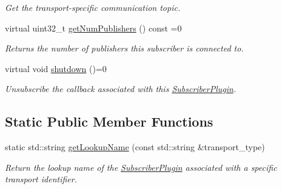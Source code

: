 \begin{DoxyCompactItemize}
\begin{DoxyCompactList}\small\item\em Get the transport-\/specific communication topic. \end{DoxyCompactList}\item 
\hypertarget{classimage__transport_1_1_subscriber_plugin_a7fae40b302a6493d00b0cd8905484677}{virtual uint32\-\_\-t \hyperlink{classimage__transport_1_1_subscriber_plugin_a7fae40b302a6493d00b0cd8905484677}{get\-Num\-Publishers} () const =0}\label{classimage__transport_1_1_subscriber_plugin_a7fae40b302a6493d00b0cd8905484677}

\begin{DoxyCompactList}\small\item\em Returns the number of publishers this subscriber is connected to. \end{DoxyCompactList}\item 
\hypertarget{classimage__transport_1_1_subscriber_plugin_aa8af1348748aef7372bf248a69f775a7}{virtual void \hyperlink{classimage__transport_1_1_subscriber_plugin_aa8af1348748aef7372bf248a69f775a7}{shutdown} ()=0}\label{classimage__transport_1_1_subscriber_plugin_aa8af1348748aef7372bf248a69f775a7}

\begin{DoxyCompactList}\small\item\em Unsubscribe the callback associated with this \hyperlink{classimage__transport_1_1_subscriber_plugin}{Subscriber\-Plugin}. \end{DoxyCompactList}\end{DoxyCompactItemize}
\subsection*{Static Public Member Functions}
\begin{DoxyCompactItemize}
\item 
\hypertarget{classimage__transport_1_1_subscriber_plugin_ae48e1648e998fe8352ff385c4c132531}{static std\-::string \hyperlink{classimage__transport_1_1_subscriber_plugin_ae48e1648e998fe8352ff385c4c132531}{get\-Lookup\-Name} (const std\-::string \&transport\-\_\-type)}\label{classimage__transport_1_1_subscriber_plugin_ae48e1648e998fe8352ff385c4c132531}

\begin{DoxyCompactList}\small\item\em Return the lookup name of the \hyperlink{classimage__transport_1_1_subscriber_plugin}{Subscriber\-Plugin} associated with a specific transport identifier. \end{DoxyCompactList}\end{DoxyCompactItemize}
